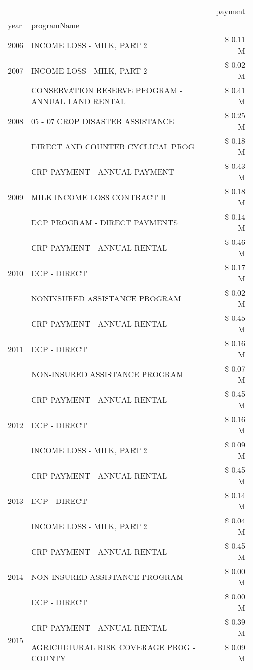 \begin{tabular}{llr}
\toprule
 &  & payment \\
year & programName &  \\
\midrule
2006 & INCOME LOSS - MILK, PART 2 & \$ 0.11 M \\
\cline{1-3}
2007 & INCOME LOSS - MILK, PART 2 & \$ 0.02 M \\
\cline{1-3}
\multirow[t]{3}{*}{2008} & CONSERVATION RESERVE PROGRAM - ANNUAL LAND RENTAL & \$ 0.41 M \\
 & 05 - 07 CROP DISASTER ASSISTANCE & \$ 0.25 M \\
 & DIRECT AND COUNTER CYCLICAL PROG & \$ 0.18 M \\
\cline{1-3}
\multirow[t]{3}{*}{2009} & CRP PAYMENT - ANNUAL PAYMENT & \$ 0.43 M \\
 & MILK INCOME LOSS CONTRACT II & \$ 0.18 M \\
 & DCP PROGRAM - DIRECT PAYMENTS & \$ 0.14 M \\
\cline{1-3}
\multirow[t]{3}{*}{2010} & CRP PAYMENT - ANNUAL RENTAL & \$ 0.46 M \\
 & DCP - DIRECT & \$ 0.17 M \\
 & NONINSURED ASSISTANCE PROGRAM & \$ 0.02 M \\
\cline{1-3}
\multirow[t]{3}{*}{2011} & CRP PAYMENT - ANNUAL RENTAL & \$ 0.45 M \\
 & DCP - DIRECT & \$ 0.16 M \\
 & NON-INSURED ASSISTANCE PROGRAM & \$ 0.07 M \\
\cline{1-3}
\multirow[t]{3}{*}{2012} & CRP PAYMENT - ANNUAL RENTAL & \$ 0.45 M \\
 & DCP - DIRECT & \$ 0.16 M \\
 & INCOME LOSS - MILK, PART 2 & \$ 0.09 M \\
\cline{1-3}
\multirow[t]{3}{*}{2013} & CRP PAYMENT - ANNUAL RENTAL & \$ 0.45 M \\
 & DCP - DIRECT & \$ 0.14 M \\
 & INCOME LOSS - MILK, PART 2 & \$ 0.04 M \\
\cline{1-3}
\multirow[t]{3}{*}{2014} & CRP PAYMENT - ANNUAL RENTAL & \$ 0.45 M \\
 & NON-INSURED ASSISTANCE PROGRAM & \$ 0.00 M \\
 & DCP - DIRECT & \$ 0.00 M \\
\cline{1-3}
\multirow[t]{3}{*}{2015} & CRP PAYMENT - ANNUAL RENTAL & \$ 0.39 M \\
 & AGRICULTURAL RISK COVERAGE PROG - COUNTY & \$ 0.09 M \\

\end{tabular}
